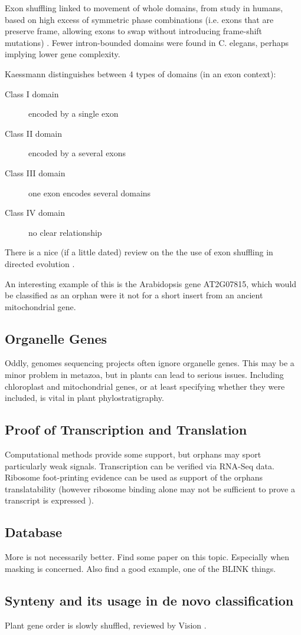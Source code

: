 Exon shuffling linked to movement of whole domains, from study in humans, based
on high excess of symmetric phase combinations (i.e. exons that are preserve
frame, allowing exons to swap without introducing frame-shift mutations)
\cite{kaessmann_signatures_2002}. Fewer intron-bounded domains were found in C.
elegans, perhaps implying lower gene complexity.

Kaessmann distinguishes between 4 types of domains (in an exon context):
\begin{description}
    \item[Class I domain] encoded by a single exon 
    \item[Class II domain] encoded by a several exons
    \item[Class III domain] one exon encodes several domains
    \item[Class IV domain] no clear relationship
\end{description}

There is a nice (if a little dated) review on the the use of exon shuffling in
directed evolution \cite{kolkman_directed_2001}.


An interesting example of this is the Arabidopsis gene AT2G07815, which would
be classified as an orphan were it not for a short insert from an ancient
mitochondrial gene.


\subsection{Organelle Genes} Oddly, genomes sequencing projects often
ignore organelle genes. This may be a minor problem in metazoa, but in
plants can lead to serious issues. Including chloroplast and mitochondrial
genes, or at least specifying whether they were included, is vital in plant
phylostratigraphy.

\subsection{Proof of Transcription and Translation} Computational methods
provide some support, but orphans may sport particularly weak signals.
Transcription can be verified via RNA-Seq data. Ribosome foot-printing
evidence can be used as support of the orphans translatability (however
ribosome binding alone may not be sufficient to prove a transcript is
expressed \cite{guttman_ribosome_2013}).

\subsection{Database} More is not necessarily better. Find some paper on
this topic. Especially when masking is concerned. Also find a good example,
one of the BLINK things.

\subsection{Synteny and its usage in de novo classification}

Plant gene order is slowly shuffled, reviewed by Vision \cite{vision_gene_2005}.
